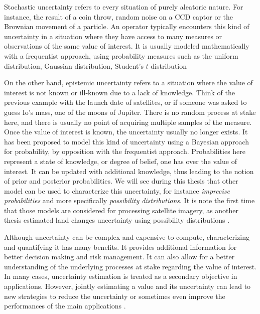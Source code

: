 Stochastic uncertainty refers to every situation of purely aleatoric nature. For instance, the result of a coin throw, random noise on a CCD captor or the Brownian movement of a particle. An operator typically encounters this kind of uncertainty in a situation where they have access to many measures or observations of the same value of interest. It is usually modeled mathematically with a frequentist approach, using probability measures such as the uniform distribution, Gaussian distribution, Student's $t$ distribution \etc 

On the other hand, epistemic uncertainty refers to a situation where the value of interest is not known or ill-known due to a lack of knowledge. Think of the previous example with the launch date of satellites, or if someone was asked to guess Io's mass, one of the moons of Jupiter. There is no random process at stake here, and there is usually no point of acquiring multiple samples of the measure. Once the value of interest is known, the uncertainty usually no longer exists. It has been proposed to model this kind of uncertainty using a Bayesian approach for probability, by opposition with the frequentist approach. Probabilities here represent a state of knowledge, or degree of belief, one has over the value of interest. It can be updated with additional knowledge, thus leading to the notion of prior and posterior probabilities. We will see during this thesis that other model can be used to characterize this uncertainty, for instance \textit{imprecise probabilities} and more specifically \textit{possibility distributions}. It is note the first time that those models are considered for processing satellite imagery, as another thesis estimated land changes uncertainty using possibility distributions \cite{lesniewska-choquet_specialite_2020}.

Although uncertainty can be complex and expensive to compute, characterizing and quantifying it has many benefits. It provides additional information for better decision making and risk management. It can also allow for a better understanding of the underlying processes at stake regarding the value of interest. In many cases, uncertainty estimation is treated as a secondary objective in applications. However, jointly estimating a value and its uncertainty can lead to new strategies to reduce the uncertainty or sometimes even improve the performances of the main applications \cite{chen_learning_2023,jiang_unsupervised_2024}.

